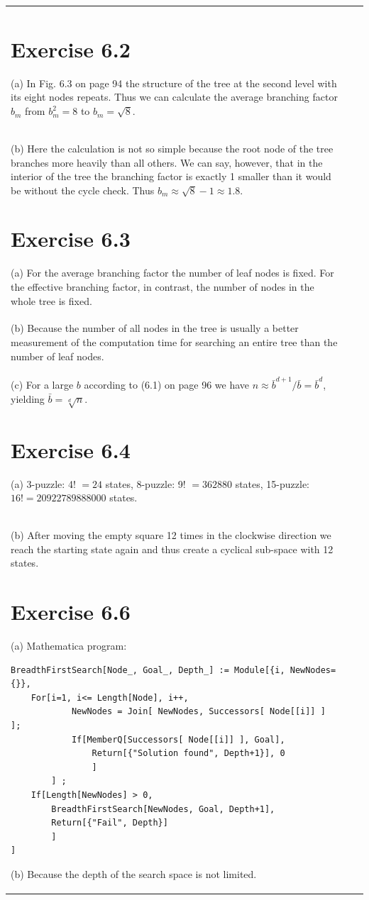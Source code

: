 \documentclass[10pt]{book}
\begin{document}
\begin{center}
\begin{tabular}{|l|l|l|}
\section{Exercise 6.2}
(a) In Fig. 6.3 on page 94 the structure of the tree at the second level with its eight nodes repeats. Thus we can calculate the average branching factor $b_{m}$ from $b_{m}^{2}=8$ to $b_{m}=\sqrt{8}$.\\
(b) Here the calculation is not so simple because the root node of the tree branches more heavily than all others. We can say, however, that in the interior of the tree the branching factor is exactly 1 smaller than it would be without the cycle check. Thus $b_{m} \approx \sqrt{8}-1 \approx 1.8$.

\section{Exercise 6.3}
(a) For the average branching factor the number of leaf nodes is fixed. For the effective branching factor, in contrast, the number of nodes in the whole tree is fixed.\\
(b) Because the number of all nodes in the tree is usually a better measurement of the computation time for searching an entire tree than the number of leaf nodes.\\
(c) For a large $b$ according to (6.1) on page 96 we have $n \approx \bar{b}^{d+1} / \bar{b}=\bar{b}^{d}$, yielding $\bar{b}=\sqrt[d]{n}$.

\section{Exercise 6.4}
(a) 3-puzzle: 4! $=24$ states, 8-puzzle: 9! $=362880$ states, 15-puzzle: $16!=20922789888000$ states.\\
(b) After moving the empty square 12 times in the clockwise direction we reach the starting state again and thus create a cyclical sub-space with 12 states.

\section{Exercise 6.6}
(a) Mathematica program:
\begin{verbatim}
BreadthFirstSearch[Node_, Goal_, Depth_] := Module[{i, NewNodes={}},
    For[i=1, i<= Length[Node], i++,
            NewNodes = Join[ NewNodes, Successors[ Node[[i]] ] ];
            If[MemberQ[Successors[ Node[[i]] ], Goal],
                Return[{"Solution found", Depth+1}], 0
                ]
        ] ;
    If[Length[NewNodes] > 0,
        BreadthFirstSearch[NewNodes, Goal, Depth+1],
        Return[{"Fail", Depth}]
        ]
]
\end{verbatim}
(b) Because the depth of the search space is not limited.


\end{tabular}
\end{center}
\end{document}
